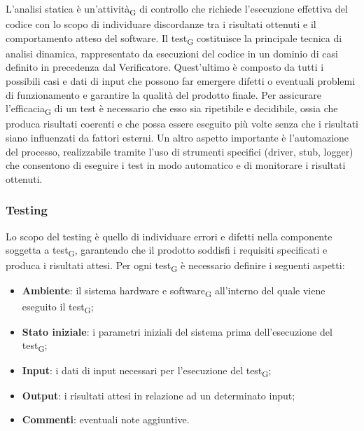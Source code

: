 L'analisi statica è un'{attività\textsubscript{G}} di controllo che richiede l'esecuzione effettiva del codice con lo scopo di
individuare discordanze tra i risultati ottenuti e il comportamento atteso del software. Il {test\textsubscript{G}} costituisce
la principale tecnica di analisi dinamica, rappresentato da esecuzioni del codice in un dominio di casi definito in precedenza dal Verificatore.
Quest'ultimo è composto da tutti i possibili casi e dati di input che possono far emergere difetti o eventuali problemi di funzionamento e
garantire la qualità del prodotto finale. Per assicurare l'{efficacia\textsubscript{G}} di un test è necessario
che esso sia ripetibile e decidibile, ossia che produca risultati coerenti e che possa essere eseguito più volte senza che 
i risultati siano influenzati da fattori esterni. Un altro aspetto importante è l'automazione del processo, realizzabile tramite l'uso di
strumenti specifici (driver, stub, logger) che consentono di eseguire i test in modo automatico e di monitorare i risultati ottenuti.

\subsubsection{Testing} \label{testing}
Lo scopo del testing è quello di individuare errori e difetti nella componente soggetta a {test\textsubscript{G}},
garantendo che il prodotto soddisfi i requisiti specificati e produca i risultati attesi. Per ogni {test\textsubscript{G}}
è necessario definire i seguenti aspetti:
\begin{itemize}
    \item \textbf{Ambiente}: il sistema hardware e {software\textsubscript{G}} all'interno del quale viene eseguito il {test\textsubscript{G}};
    \item \textbf{Stato iniziale}: i parametri iniziali del sistema prima dell'esecuzione del {test\textsubscript{G}};
    \item \textbf{Input}: i dati di input necessari per l'esecuzione del {test\textsubscript{G}};
    \item \textbf{Output}: i risultati attesi in relazione ad un determinato input;
    \item \textbf{Commenti}: eventuali note aggiuntive.
\end{itemize}


